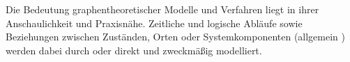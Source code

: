 Die Bedeutung graphentheoretischer Modelle und Verfahren liegt in ihrer Anschaulichkeit und Praxisnähe. Zeitliche und logische Abläufe sowie Beziehungen zwischen Zuständen, Orten oder Systemkomponenten (allgemein ) werden dabei durch  oder  direkt und zweckmäßig modelliert.